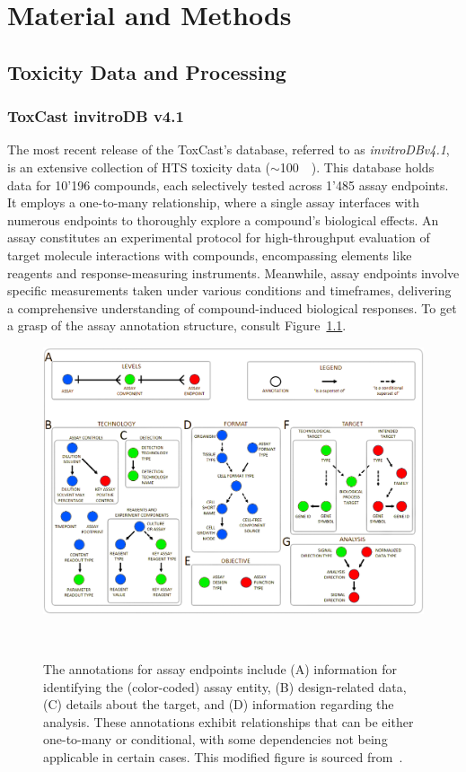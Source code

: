 \chapter{Material and Methods}\label{chap:material_and_methods}

\section{Toxicity Data and Processing}\label{sec:invitrodb}
\subsection{ToxCast invitroDB v4.1}
The most recent release of the ToxCast's database, referred to as \emph{invitroDBv4.1}, is an extensive collection of HTS toxicity data ($\sim$\SI{100}{\giga\byte}). This database holds data for 10'196 compounds, each selectively tested across 1'485 assay endpoints. It employs a one-to-many relationship, where a single assay interfaces with numerous endpoints to thoroughly explore a compound's biological effects. An assay constitutes an experimental protocol for high-throughput evaluation of target molecule interactions with compounds, encompassing elements like reagents and response-measuring instruments. Meanwhile, assay endpoints involve specific measurements taken under various conditions and timeframes, delivering a comprehensive understanding of compound-induced biological responses. To get a grasp of the assay annotation structure, consult Figure~\ref{fig:assay}.

\begin{figure}  %
    \centering
    \includegraphics[width=1.0\textwidth]{figures/assay.png}  
    \caption{The annotations for assay endpoints include (A) information for identifying the (color-coded) assay entity, (B) design-related data, (C) details about the target, and (D) information regarding the analysis. These annotations exhibit relationships that can be either one-to-many or conditional, with some dependencies not being applicable in certain cases. This modified figure is sourced from~\cite{userguide}.}
~\label{fig:assay} 
\end{figure}

